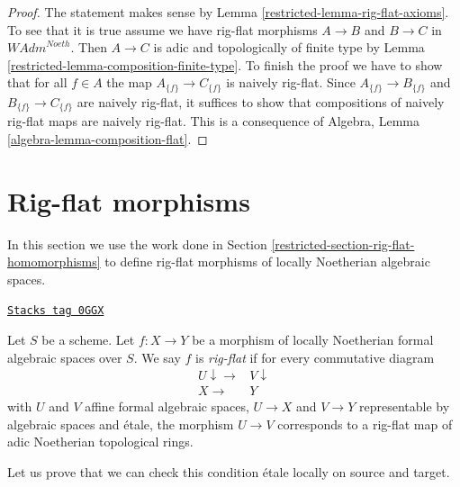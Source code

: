 \begin{proof}

The statement makes sense by Lemma \ref{restricted-lemma-rig-flat-axioms}.
To see that it is true assume we have rig-flat morphisms
$A \to B$ and $B \to C$ in $\textit{WAdm}^{Noeth}$.
Then $A \to C$ is adic and topologically of finite type
by Lemma \ref{restricted-lemma-composition-finite-type}.
To finish the proof we have to show that for all $f \in A$ the map
$A_{\{f\}} \to C_{\{f\}}$ is naively rig-flat.
Since $A_{\{f\}} \to B_{\{f\}}$ and $B_{\{f\}} \to C_{\{f\}}$
are naively rig-flat, it suffices to show that
compositions of naively rig-flat maps are naively rig-flat.
This is a consequence of Algebra, Lemma \ref{algebra-lemma-composition-flat}.
\end{proof}

\section{Rig-flat morphisms}
\label{restricted-section-rig-flat-morphisms}
In this section we use the work done in
Section \ref{restricted-section-rig-flat-homomorphisms}
to define rig-flat morphisms of locally Noetherian algebraic spaces.

\begin{definition}
\label{restricted-definition-rig-flat}
\href{https://stacks.math.columbia.edu/tag/0GGX}{\texttt{Stacks tag 0GGX}}

Let $S$ be a scheme. Let $f : X \to Y$ be a morphism of locally
Noetherian formal algebraic spaces over $S$. We say $f$ is
{\it rig-flat} if for every commutative diagram
$$
\begin{array}{cc}U \downarrow\longrightarrow & V \downarrow \\ X \longrightarrow & Y\end{array}
$$
with $U$ and $V$ affine formal algebraic spaces, $U \to X$ and $V \to Y$
representable by algebraic spaces and \'etale, the morphism $U \to V$
corresponds to a rig-flat map of adic Noetherian topological rings.
\end{definition}

Let us prove that we can check this condition \'etale locally on
source and target.

